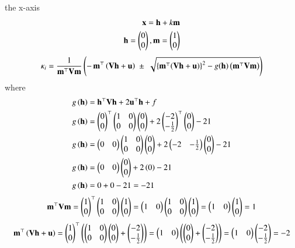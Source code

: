 \documentclass[journal]{IEEEtran}
\begin{document}
the x-axis
\begin{align}
\vec{x}=\vec{h}+k\vec{m}\\
\vec{h}=\myvec{0\\0},\vec{m}=\myvec{1\\0}
\end{align}
\begin{align}
\kappa_i= \frac{1}{\vec{m}^\top \vec{V}\vec{m}}\brak{
       -\,\vec{m}^\top\brak{\vec{V}\vec{h}+\vec{u}}
       \;\pm\;
       \sqrt{ \cbrak{\vec{m}^\top(\vec{V}\vec{h}+\vec{u})}^2
       - g(\vec{h})\,\big(\vec{m}^\top \vec{V}\vec{m}\big)}
     }
\end{align}
where
\begin{align}
g\brak{\vec{h}} &= \vec{h}^\top\vec{V}\vec{h}+2\vec{u}^\top\vec{h}+f \\
g\brak{\vec{h}} &= \myvec{0\\0}^\top\myvec{1&0\\0&0}\myvec{0\\0}+2\myvec{-2\\-\frac{1}{2}}^\top\myvec{0\\0}-21 \\
g\brak{\vec{h}} &= \myvec{0&0}\myvec{1&0\\0&0}\myvec{0\\0}+2\myvec{-2&-\frac{1}{2}}\myvec{0\\0}-21 \\
g\brak{\vec{h}} &= \myvec{0&0}\myvec{0\\0}+2\brak{0}-21 \\
g\brak{\vec{h}} &= 0+0-21=-21
\end{align}
     \begin{align}
     \vec{m}^\top \vec{V}\vec{m}=\myvec{1\\0}^\top\myvec{1&0\\0&0}\myvec{1\\0}=\myvec{1&0}\myvec{1&0\\0&0}\myvec{1\\0}=\myvec{1&0}\myvec{1\\0}=1
     \end{align}
     \begin{align}
    \vec{m}^\top\brak{\vec{V}\vec{h}+\vec{u}}
    = \myvec{1\\0}^\top\brak{\myvec{1&0\\0&0}\myvec{0\\0}+\myvec{-2\\-\frac{1}{2}}}=\myvec{1&0}\brak{\myvec{0\\0}+\myvec{-2\\-\frac{1}{2}}}=\myvec{1&0}\myvec{-2\\-\frac{1}{2}}=-2
\end{align}
\end{document}
